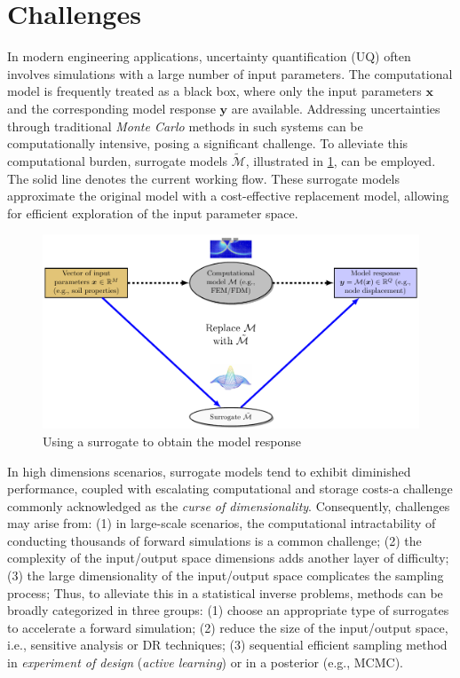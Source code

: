 \section{Challenges}
In modern engineering applications, uncertainty quantification (UQ) often involves simulations with a large number of input parameters. The computational model is frequently treated as a black box, where only the input parameters $\boldsymbol{x}$ and the corresponding model response $\boldsymbol{y}$ are available. Addressing uncertainties through traditional \textit{Monte Carlo} methods in such systems can be computationally intensive, posing a significant challenge. To alleviate this computational burden, surrogate models $\tilde{\mathcal{M}}$, illustrated in \cref{fig: UQ_surrogate}, can be employed. The solid line denotes the current working flow. These surrogate models approximate the original model with a cost-effective replacement model, allowing for efficient exploration of the input parameter space. 
\begin{figure}[htbp]
    \centering
    \includegraphics[width = 140mm]{Figures/figure-UQ_surrogate.pdf}
    \caption{Using a surrogate to obtain the model response}
    \label{fig: UQ_surrogate}
\end{figure}

 In high dimensions scenarios, surrogate models tend to exhibit diminished performance, coupled with escalating computational and storage costs-a challenge commonly acknowledged as the \textit{curse of dimensionality}. Consequently, challenges may arise from: 
 (1) in large-scale scenarios, the computational intractability of conducting thousands of forward simulations is a common challenge; (2) the complexity of the input/output space dimensions adds another layer of difficulty;(3) the large dimensionality of the input/output space complicates the sampling process;
 Thus, to alleviate this in a statistical inverse problems, methods can be broadly categorized in three groups: (1) choose an appropriate type of surrogates to accelerate a forward simulation; (2) reduce the size of the input/output space, i.e., sensitive analysis or \acrlong{DR} techniques; (3) sequential efficient sampling method in \textit{experiment of design} (\textit{active learning}) or in a posterior (e.g., \acrshort{MCMC}).


